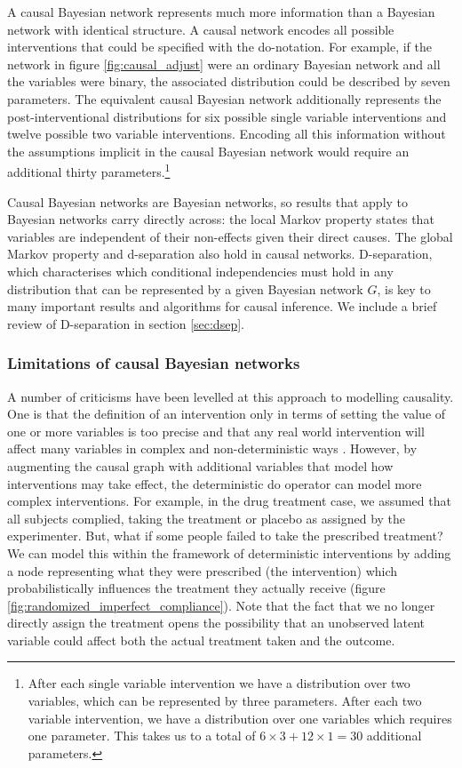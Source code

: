 \documentclass[11pt,a4paper,twoside]{report}
\theoremstyle{plain}
\theoremstyle{definition}
\begin{document}
A causal Bayesian network represents much more information than a Bayesian network with identical structure. A causal network encodes all possible interventions that could be specified with the do-notation. For example, if the network in figure \ref{fig:causal_adjust} were an ordinary Bayesian network and all the variables were binary, the associated distribution could be described by seven parameters. The equivalent causal Bayesian network additionally represents the post-interventional distributions for six possible single variable interventions and twelve possible two variable interventions. Encoding all this information without the assumptions implicit in the causal Bayesian network would require an additional thirty parameters.\footnote{After each single variable intervention we have a distribution over two variables, which can be represented by three parameters. After each two variable intervention, we have a distribution over one variables which requires one parameter. This takes us to a total of $6\times3+12\times1 = 30$ additional parameters.}

Causal Bayesian networks are Bayesian networks, so results that apply to Bayesian networks carry directly across: the local Markov property states that variables are independent of their non-effects given their direct causes. The global Markov property and d-separation also hold in causal networks. D-separation, which characterises which conditional independencies must hold in any distribution that can be represented by a given Bayesian network $G$, is key to many important results and algorithms for causal inference. We include a brief review of D-separation in section \ref{sec:dsep}. 


\subsubsection{Limitations of causal Bayesian networks}
A number of criticisms have been levelled at this approach to modelling causality. One is that the definition of an intervention only in terms of setting the value of one or more variables is too precise and that any real world intervention will affect many variables in complex and non-deterministic ways \citep{rickles2009causality,cartwright2007hunting}. However, by augmenting the causal graph with additional variables that model how interventions may take effect, the deterministic do operator can model more complex interventions. For example, in the drug treatment case, we assumed that all subjects complied, taking the treatment or placebo as assigned by the experimenter. But, what if some people failed to take the prescribed treatment? We can model this within the framework of deterministic interventions by adding a node representing what they were prescribed (the intervention) which probabilistically influences the treatment they actually receive (figure \ref{fig:randomized_imperfect_compliance}). Note that the fact that we no longer directly assign the treatment opens the possibility that an unobserved latent variable could affect both the actual treatment taken and the outcome.
\end{document}
